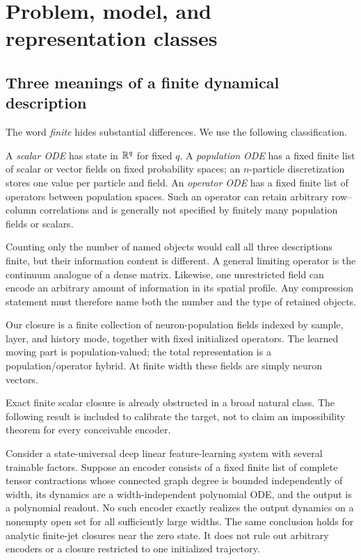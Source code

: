 \section{Problem, model, and representation classes}
\label{sec:problem}

\subsection{Three meanings of a finite dynamical description}

The word \emph{finite} hides substantial differences.  We use the following
classification.

\begin{definition}
A \emph{scalar ODE} has state in $\mathbb R^q$ for fixed $q$.  A
\emph{population ODE} has a fixed finite list of scalar or vector fields on
fixed probability spaces; an $n$-particle discretization stores one value per
particle and field.  An \emph{operator ODE} has a fixed finite list of
operators between population spaces.  Such an operator can retain arbitrary
row--column correlations and is generally not specified by finitely many
population fields or scalars.
\end{definition}

Counting only the number of named objects would call all three descriptions
finite, but their information content is different.  A general limiting
operator is the continuum analogue of a dense matrix.  Likewise, one
unrestricted field can encode an arbitrary amount of information in its
spatial profile.  Any compression statement must therefore name both the
number and the type of retained objects.

Our closure is a finite collection of neuron-population fields indexed by
sample, layer, and history mode, together with fixed initialized operators.
The learned moving part is population-valued; the total representation is a
population/operator hybrid.  At finite width these fields are simply neuron
vectors.

Exact finite scalar closure is already obstructed in a broad natural class.
The following result is included to calibrate the target, not to claim an
impossibility theorem for every conceivable encoder.

\begin{proposition}
\label{prop:scalar-no-go}
Consider a state-universal deep linear feature-learning system with several
trainable factors.  Suppose an encoder consists of a fixed finite list of
complete tensor contractions whose connected graph degree is bounded
independently of width, its dynamics are a width-independent polynomial ODE,
and the output is a polynomial readout.  No such encoder exactly realizes the
output dynamics on a nonempty open set for all sufficiently large widths.
The same conclusion holds for analytic finite-jet closures near the zero
state.  It does not rule out arbitrary encoders or a closure restricted to one
initialized trajectory.
\end{proposition}

